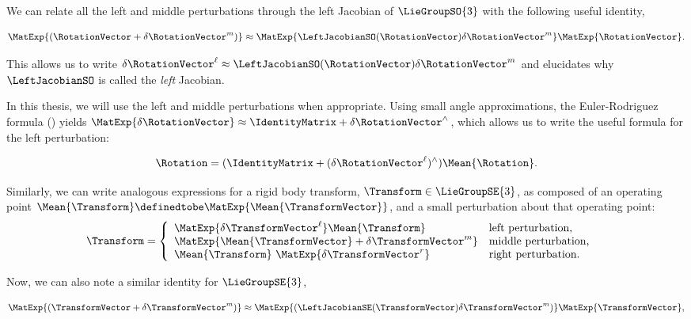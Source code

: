 We can relate all the left and middle perturbations through the left Jacobian of $\LieGroupSO{3}$ with the following useful identity,

\begin{equation}
\MatExp{( \RotationVector + \delta \RotationVector^m)} \approx \MatExp{\LeftJacobianSO(\RotationVector) \delta \RotationVector^m} \MatExp{\RotationVector}.	
\end{equation}

This allows us to write $\delta \RotationVector^\ell \approx \LeftJacobianSO(\RotationVector) \delta \RotationVector^m$ and elucidates why $\LeftJacobianSO$ is called the \textit{left} Jacobian. 


In this thesis, we will use the left and middle perturbations when appropriate. Using small angle approximations, the Euler-Rodriguez formula () yields $\MatExp{\delta \RotationVector} \approx \IdentityMatrix + \delta \RotationVector^\wedge$, which allows us to write the useful formula for the left perturbation:

\begin{equation}
	\Rotation = (\IdentityMatrix + (\delta \RotationVector^\ell)^\wedge) \Mean{\Rotation}.
\end{equation}

Similarly, we can write analogous expressions for a rigid body transform, $\Transform \in \LieGroupSE{3}$, as composed of an operating point $\Mean{\Transform} \definedtobe \MatExp{\Mean{\TransformVector}}$, and a small perturbation about that operating point:
\begin{align}
\Transform &= \left\{  	\begin{array}{ll}
		\MatExp{\delta \TransformVector^\ell} \Mean{\Transform}   & \mbox{left perturbation,} \\
		\MatExp{\Mean{\TransformVector} + \delta \TransformVector^m}  & \mbox{middle perturbation,} \\
		\Mean{\Transform} ~ \MatExp{\delta \TransformVector^r}  & \mbox{right perturbation.}  \\
	\end{array}
	\right.
\end{align}

Now, we can also note a similar identity for $\LieGroupSE{3}$,
 
\begin{equation}
\MatExp{( \TransformVector + \delta \TransformVector^m)} \approx \MatExp{(\LeftJacobianSE(\TransformVector) \delta \TransformVector^m)} \MatExp{\TransformVector},
\end{equation}

